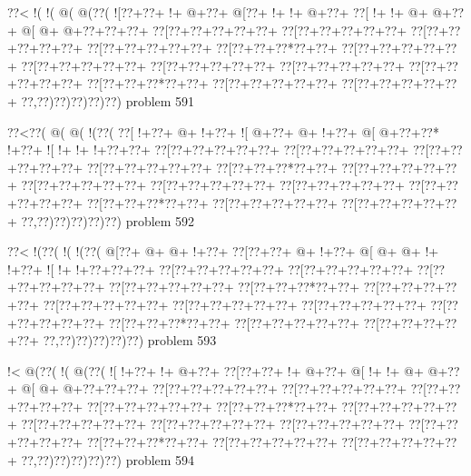 \vbox{\vbox{\goo
\0??<\- !(\- !(\- @(\- @(\0??(
\- ![\0??+\0??+\- !+\- @+\0??+
\- @[\0??+\- !+\- !+\- @+\0??+
\0??[\- !+\- !+\- @+\- @+\0??+
\- @[\- @+\- @+\0??+\0??+\0??+
\0??[\0??+\0??+\0??+\0??+\0??+
\0??[\0??+\0??+\0??+\0??+\0??+
\0??[\0??+\0??+\0??+\0??+\0??+
\0??[\0??+\0??+\0??+\0??+\0??+
\0??[\0??+\0??+\0??*\0??+\0??+
\0??[\0??+\0??+\0??+\0??+\0??+
\0??[\0??+\0??+\0??+\0??+\0??+
\0??[\0??+\0??+\0??+\0??+\0??+
\0??[\0??+\0??+\0??+\0??+\0??+
\0??[\0??+\0??+\0??+\0??+\0??+
\0??[\0??+\0??+\0??*\0??+\0??+
\0??[\0??+\0??+\0??+\0??+\0??+
\0??[\0??+\0??+\0??+\0??+\0??+
\0??,\0??)\0??)\0??)\0??)\0??)
}
\hfil problem 591\hfil\break
}

\vbox{\vbox{\goo
\0??<\0??(\- @(\- @(\- !(\0??(
\0??[\- !+\0??+\- @+\- !+\0??+
\- ![\- @+\0??+\- @+\- !+\0??+
\- @[\- @+\0??+\0??*\- !+\0??+
\- ![\- !+\- !+\- !+\0??+\0??+
\0??[\0??+\0??+\0??+\0??+\0??+
\0??[\0??+\0??+\0??+\0??+\0??+
\0??[\0??+\0??+\0??+\0??+\0??+
\0??[\0??+\0??+\0??+\0??+\0??+
\0??[\0??+\0??+\0??*\0??+\0??+
\0??[\0??+\0??+\0??+\0??+\0??+
\0??[\0??+\0??+\0??+\0??+\0??+
\0??[\0??+\0??+\0??+\0??+\0??+
\0??[\0??+\0??+\0??+\0??+\0??+
\0??[\0??+\0??+\0??+\0??+\0??+
\0??[\0??+\0??+\0??*\0??+\0??+
\0??[\0??+\0??+\0??+\0??+\0??+
\0??[\0??+\0??+\0??+\0??+\0??+
\0??,\0??)\0??)\0??)\0??)\0??)
}
\hfil problem 592\hfil\break
}

\vbox{\vbox{\goo
\0??<\- !(\0??(\- !(\- !(\0??(
\- @[\0??+\- @+\- @+\- !+\0??+
\0??[\0??+\0??+\- @+\- !+\0??+
\- @[\- @+\- @+\- !+\- !+\0??+
\- ![\- !+\- !+\0??+\0??+\0??+
\0??[\0??+\0??+\0??+\0??+\0??+
\0??[\0??+\0??+\0??+\0??+\0??+
\0??[\0??+\0??+\0??+\0??+\0??+
\0??[\0??+\0??+\0??+\0??+\0??+
\0??[\0??+\0??+\0??*\0??+\0??+
\0??[\0??+\0??+\0??+\0??+\0??+
\0??[\0??+\0??+\0??+\0??+\0??+
\0??[\0??+\0??+\0??+\0??+\0??+
\0??[\0??+\0??+\0??+\0??+\0??+
\0??[\0??+\0??+\0??+\0??+\0??+
\0??[\0??+\0??+\0??*\0??+\0??+
\0??[\0??+\0??+\0??+\0??+\0??+
\0??[\0??+\0??+\0??+\0??+\0??+
\0??,\0??)\0??)\0??)\0??)\0??)
}
\hfil problem 593\hfil\break
}

\vbox{\vbox{\goo
\- !<\- @(\0??(\- !(\- @(\0??(
\- ![\- !+\0??+\- !+\- @+\0??+
\0??[\0??+\0??+\- !+\- @+\0??+
\- @[\- !+\- !+\- @+\- @+\0??+
\- @[\- @+\- @+\0??+\0??+\0??+
\0??[\0??+\0??+\0??+\0??+\0??+
\0??[\0??+\0??+\0??+\0??+\0??+
\0??[\0??+\0??+\0??+\0??+\0??+
\0??[\0??+\0??+\0??+\0??+\0??+
\0??[\0??+\0??+\0??*\0??+\0??+
\0??[\0??+\0??+\0??+\0??+\0??+
\0??[\0??+\0??+\0??+\0??+\0??+
\0??[\0??+\0??+\0??+\0??+\0??+
\0??[\0??+\0??+\0??+\0??+\0??+
\0??[\0??+\0??+\0??+\0??+\0??+
\0??[\0??+\0??+\0??*\0??+\0??+
\0??[\0??+\0??+\0??+\0??+\0??+
\0??[\0??+\0??+\0??+\0??+\0??+
\0??,\0??)\0??)\0??)\0??)\0??)
}
\hfil problem 594\hfil\break
}

